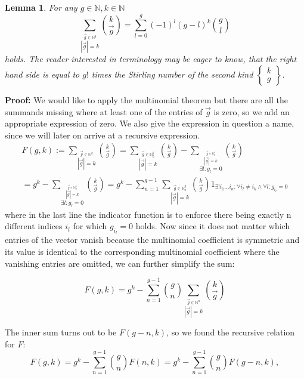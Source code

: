 \documentclass[b5paper,draft,openbib,12pt]{memoir}
\newtheorem{Lemma}[Def]{Lemma}
\begin{document}
\begin{Lemma}\label{stirling lemma}
For any \(g\in\mathbb{N},k\in\mathbb{N}\)
\begin{equation}
\sum_{\stackrel{\vec{g}\in\mathbb{N}^g}{|\vec{g}|=k}} \binom{k}{\vec{g}}=\sum_{l=0}^g (-1)^l (g-l)^k \binom{g}{l}
\end{equation}
holds. The reader interested in terminology may be eager to know, that the right hand side is equal to
 \(g!\) times the Stirling 
number of the second kind \(\left\{\begin{matrix}k\\g\end{matrix}\right\}\).
\end{Lemma}
\textbf{Proof:} We would like to apply the multinomial theorem but there are all the summands missing where at least
one of the entries of \(\vec{g}\) is zero, so we add an appropriate expression of zero. We also give the expression in
question a name, since we will later on arrive at a recursive expression.
\begin{multline}
F(g,k):=\sum_{\stackrel{\vec{g}\in\mathbb{N}^g}{|\vec{g}|=k}} \binom{k}{\vec{g}}
= \sum_{\stackrel{\vec{g}\in\mathbb{N}_0^g}{|\vec{g}|=k}} \binom{k}{\vec{g}}
- \sum_{\stackrel{\stackrel{\vec{g}\in\mathbb{N}_0^g}{|\vec{g}|=k}}{\exists l: g_l=0}} \binom{k}{\vec{g}}\\
= g^k 
 - \sum_{\stackrel{\stackrel{\vec{g}\in\mathbb{N}_0^g}{|\vec{g}|=k}}{\exists l: g_l=0}} \binom{k}{\vec{g}}
=g^k 
- \sum_{n=1}^{g-1} \sum_{\stackrel{\vec{g}\in\mathbb{N}_0^g}{|\vec{g}|=k}}
 \binom{k}{\vec{g}} 1_{\exists! i_1\dots i_n : \forall i_l\neq i_k \wedge \forall l :g_{i_l}=0}
\end{multline}
where in the last line the indicator function is to enforce there being exactly n different indices \(i_l\) for which \(g_{i_l}=0\)
holds. Now since it does not matter which entries of the vector vanish because the multinomial coefficient 
is symmetric and its value is identical to the corresponding multinomial coefficient where the vanishing entries
are omitted, we can further simplify the sum:

\begin{equation*}
F(g,k)= g^k -  \sum_{n=1}^{g-1} \binom{g}{n} \sum_{\stackrel{\vec{g}\in\mathbb{N}^n}{|\vec{g}|=k}}
 \binom{k}{\vec{g}}
\end{equation*}

The inner sum turns out to be \(F(g-n,k)\), so we found the recursive relation for \(F\):
\begin{equation}\label{combinatorics solution recursive}
F(g,k)= g^k -  \sum_{n=1}^{g-1} \binom{g}{n} F(n,k)= g^k -  \sum_{n=1}^{g-1} \binom{g}{n} F(g-n,k),
\end{equation}
\end{document}
